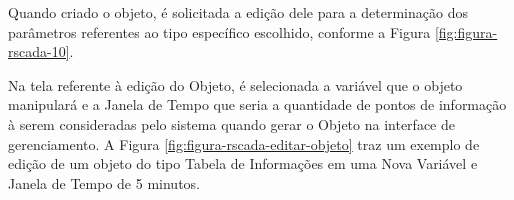         \begin{figure}[!h]
    	\end{figure}
    	
Quando criado o objeto, é solicitada a edição dele para a determinação dos parâmetros referentes ao tipo específico escolhido, conforme a Figura \ref{fig:figura-rscada-10}.
        
        \begin{figure}[!h]
    	\end{figure}
    	
Na tela referente à edição do Objeto, é selecionada a variável que o objeto manipulará e a Janela de Tempo que seria a quantidade de pontos de informação à serem consideradas pelo sistema quando gerar o Objeto na interface de gerenciamento. A Figura \ref{fig:figura-rscada-editar-objeto} traz um exemplo de edição de um objeto do tipo Tabela de Informações em uma Nova Variável e Janela de Tempo de 5 minutos.

    	
    	\begin{figure}[!h]
    	\end{figure}

